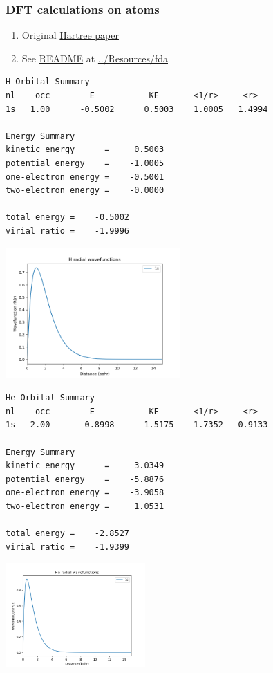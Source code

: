 \documentclass[11pt]{article}
\begin{document}
\subsubsection{DFT calculations on atoms}
\label{sec:org5d266ff}
\begin{enumerate}
\item Original \href{https://doi.org/10.1017/S0305004100011919}{Hartree paper}
\item See \href{../Resources/fda/00README.txt}{README} at \url{../Resources/fda}
\end{enumerate}

\label{}
\begin{verbatim}
H Orbital Summary
nl    occ        E           KE       <1/r>     <r>
1s   1.00      -0.5002      0.5003    1.0005   1.4994

Energy Summary
kinetic energy      =     0.5003
potential energy    =    -1.0005
one-electron energy =    -0.5001
two-electron energy =    -0.0000

total energy =    -0.5002
virial ratio =    -1.9996
\end{verbatim}


\begin{center}
\includegraphics[width=0.5\textwidth]{./Images/H-wave-functions.png}
\end{center}


\label{}
\begin{verbatim}
He Orbital Summary
nl    occ        E           KE       <1/r>     <r>
1s   2.00      -0.8998      1.5175    1.7352   0.9133

Energy Summary
kinetic energy      =     3.0349
potential energy    =    -5.8876
one-electron energy =    -3.9058
two-electron energy =     1.0531

total energy =    -2.8527
virial ratio =    -1.9399
\end{verbatim}

\begin{center}
\includegraphics[width=0.4\textwidth]{./Images/He-wave-functions.png}
\end{center}
\end{document}
